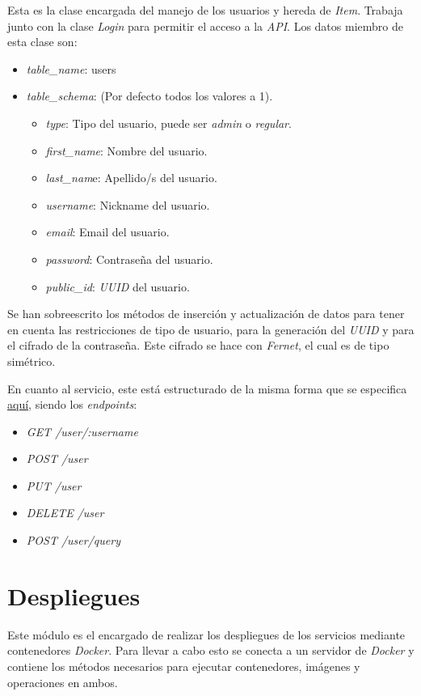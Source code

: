 Esta es la clase encargada del manejo de los usuarios y hereda de \textit{Item}. Trabaja junto con la clase \textit{Login} para permitir el acceso a la \textit{API}. Los datos miembro de esta clase son:
\begin{itemize}
	\item \textit{table\_name}: users
	\item \textit{table\_schema}: (Por defecto todos los valores a 1).
	\begin{itemize}
		\item \textit{type}: Tipo del usuario, puede ser \textit{admin} o \textit{regular}.
		\item \textit{first\_name}: Nombre del usuario.
		\item \textit{last\_nam}e: Apellido/s del usuario.
		\item \textit{username}: Nickname del usuario.
		\item \textit{email}: Email del usuario.
		\item \textit{password}: Contraseña del usuario.
		\item \textit{public\_id}: \textit{UUID} del usuario.
	\end{itemize}
\end{itemize}


\bigskip
Se han sobreescrito los métodos de inserción y actualización de datos para tener en cuenta las restricciones de tipo de usuario, para la generación del \textit{UUID} y para el cifrado de la contraseña. Este cifrado se hace con \textit{Fernet}, el cual es de tipo simétrico.

En cuanto al servicio, este está estructurado de la misma forma que se especifica \hyperref[sec:servicios]{aquí}, siendo los \textit{endpoints}:
\begin{itemize}
	\item \textit{GET /user/:username}
	\item \textit{POST /user}
	\item \textit{PUT /user}
	\item \textit{DELETE /user}
	\item \textit{POST /user/query}
\end{itemize}




\section{Despliegues}

Este módulo es el encargado de realizar los despliegues de los servicios mediante contenedores \textit{Docker}. Para llevar a cabo esto se conecta a un servidor de \textit{Docker} y contiene los métodos necesarios para ejecutar contenedores, imágenes y operaciones en ambos.

